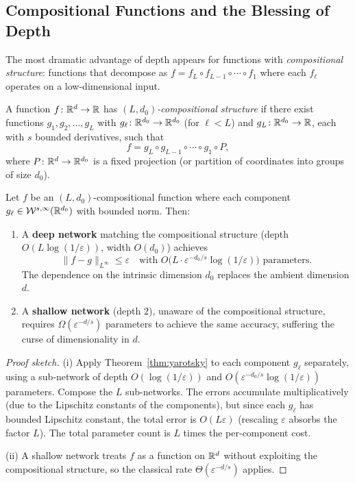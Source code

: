 \documentclass[11pt,a4paper]{article}
\begin{document}
\subsection{Compositional Functions and the Blessing of Depth}

The most dramatic advantage of depth appears for functions with
\emph{compositional structure}: functions that decompose as
$f = f_L \circ f_{L-1} \circ \cdots \circ f_1$ where each $f_\ell$
operates on a low-dimensional input.

\begin{definition}
\label{def:compositional}
A function $f \colon \mathbb{R}^d \to \mathbb{R}$ has \emph{$(L, d_0)$-compositional
structure} if there exist functions $g_1, g_2, \ldots, g_L$ with
$g_\ell \colon \mathbb{R}^{d_0} \to \mathbb{R}^{d_0}$ (for $\ell < L$) and
$g_L \colon \mathbb{R}^{d_0} \to \mathbb{R}$, each with $s$ bounded derivatives,
such that
\[
  f = g_L \circ g_{L-1} \circ \cdots \circ g_1 \circ P,
\]
where $P \colon \mathbb{R}^d \to \mathbb{R}^{d_0}$ is a fixed projection (or partition
of coordinates into groups of size $d_0$).
\end{definition}

\begin{theorem}
\label{thm:compositional}
Let $f$ be an $(L, d_0)$-compositional function where each component
$g_\ell \in \mathcal{W}^{s,\infty}(\mathbb{R}^{d_0})$ with bounded norm.
Then:
\begin{enumerate}[nosep,label=(\roman*)]
  \item A \textbf{deep network} matching the compositional structure
    (depth $O(L \log(1/\varepsilon))$, width $O(d_0)$) achieves
    \[
      \|f - g\|_{L^\infty} \le \varepsilon
      \quad \text{with } O\bigl(L \cdot \varepsilon^{-d_0/s}
      \log(1/\varepsilon)\bigr) \text{ parameters}.
    \]
    The dependence on the intrinsic dimension $d_0$ replaces the
    ambient dimension $d$.
  \item A \textbf{shallow network} (depth $2$), unaware of the
    compositional structure, requires
    $\Omega(\varepsilon^{-d/s})$ parameters to achieve the same
    accuracy, suffering the curse of dimensionality in $d$.
\end{enumerate}
\end{theorem}

\begin{proof}[Proof sketch]
(i) Apply Theorem~\ref{thm:yarotsky} to each component $g_\ell$
separately, using a sub-network of depth $O(\log(1/\varepsilon))$ and
$O(\varepsilon^{-d_0/s} \log(1/\varepsilon))$ parameters.
Compose the $L$ sub-networks.  The errors accumulate multiplicatively
(due to the Lipschitz constants of the components), but since each
$g_\ell$ has bounded Lipschitz constant, the total error is
$O(L \varepsilon)$ (rescaling $\varepsilon$ absorbs the factor $L$).
The total parameter count is $L$ times the per-component cost.

(ii) A shallow network treats $f$ as a function on $\mathbb{R}^d$ without
exploiting the compositional structure, so the classical rate
$\Theta(\varepsilon^{-d/s})$ applies.
\end{proof}
\end{document}
